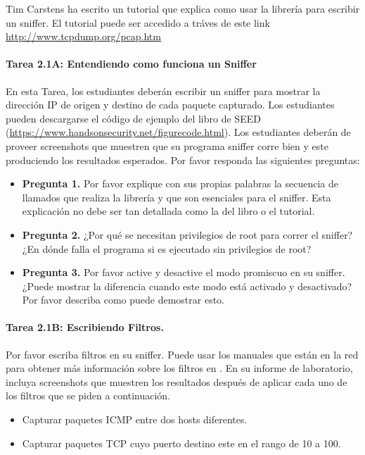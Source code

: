 Tim Carstens ha escrito un tutorial que explica como usar la librería \pcap para escribir un sniffer. El tutorial puede ser accedido a tráves de este link \url{http://www.tcpdump.org/pcap.htm}
 

\paragraph{Tarea 2.1A: Entendiendo como funciona un Sniffer}
En esta Tarea, los estudiantes deberán escribir un sniffer para mostrar la dirección IP de origen y destino de cada paquete capturado. Los estudiantes pueden descargarse el código de ejemplo del libro de SEED (\url{https://www.handsonsecurity.net/figurecode.html}). 
Los estudiantes deberán de proveer screenshots que muestren que su programa sniffer corre bien y este produciendo los resultados esperados. Por favor responda las siguientes preguntas:


\begin{itemize}
\item \textbf{Pregunta 1.} Por favor explique con sus propias palabras la secuencia de llamados que realiza la librería y que son esenciales para el sniffer. Esta explicación no debe ser tan detallada como la del libro o el tutorial.

\item \textbf{Pregunta 2.} ¿Por qué se necesitan privilegios de root para correr el sniffer? ¿En dónde falla el programa si es ejecutado sin privilegios de root?

\item \textbf{Pregunta 3.} Por favor active y desactive el modo promiscuo en su  sniffer. ¿Puede mostrar la diferencia cuando este modo está activado y desactivado? Por favor describa como puede demostrar esto.
\end{itemize}

\paragraph{Tarea 2.1B: Escribiendo Filtros.}
Por favor escriba filtros en su sniffer.
Puede usar los manuales que están en la red para obtener más información sobre los filtros en \pcap.
En su informe de laboratorio, incluya screenshots que muestren los resultados después de aplicar cada uno de los filtros que se piden a continuación.
\begin{itemize}
\item Capturar paquetes ICMP entre dos hosts diferentes.
\item Capturar paquetes TCP cuyo puerto destino este en el rango de 10 a 100.
\end{itemize}


